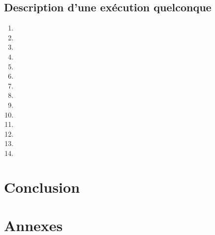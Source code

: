 \documentclass[11pt]{report}
\begin{document}
\section{Description d'une exécution quelconque} 
\newpage
\begin{enumerate}
\item 
\item 
\item 
\item 
\item 
\item 
\item 
\item 
\item 
\item 
\item 
\item 
\item 
\item 

\end{enumerate}
\chapter{Conclusion}
\newpage
\chapter{Annexes}
\end{document}

